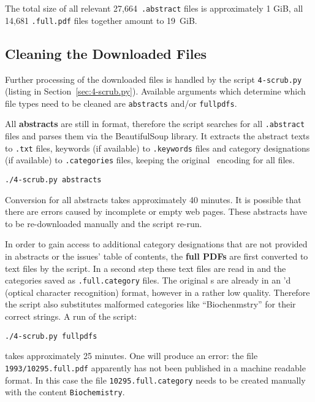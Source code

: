 
The total size of all relevant 27,664~\texttt{.abstract} files is approximately 1 GiB, all 14,681 \texttt{.full.pdf} files together amount to 19~GiB.

\subsection{Cleaning the Downloaded Files}
Further processing of the downloaded files is handled by the script \texttt{4-scrub.py} (listing in Section~\ref{sec:4-scrub.py}). Available arguments which determine which file types need to be cleaned are \texttt{abstracts} and/or \texttt{fullpdfs}.

All \textbf{abstracts} are still in  format, therefore the script searches for all \texttt{.abstract} files and parses them via the BeautifulSoup library. It extracts the abstract texts to \texttt{.txt} files, keywords (if available) to \texttt{.keywords} files and category designations (if available) to \texttt{.categories} files, keeping the original ~encoding for all files. 
\begin{verbatim}
./4-scrub.py abstracts
\end{verbatim}
Conversion for all abstracts takes approximately 40 minutes. It is possible that there are errors caused by incomplete or empty web pages. These abstracts have to be re-downloaded manually and the script re-run.

In order to gain access to additional category designations that are not provided in abstracts or the issues' table of contents, the \textbf{full PDFs} are first converted to text files by the script. In a second step these text files are read in and the categories saved as \texttt{.full.category} files. The original s are already in an 'd (optical character recognition) format, however in a rather low quality. Therefore the script also substitutes malformed categories like ``Biochenmstry'' for their correct strings.
A run of the script:
\begin{verbatim}
./4-scrub.py fullpdfs
\end{verbatim}
takes approximately 25 minutes.
One  will produce an error: the file \texttt{1993/10295.full.pdf} apparently has not been published in a machine readable format. In this case the file \texttt{10295.full.category} needs to be created manually with the content \texttt{Biochemistry}.

